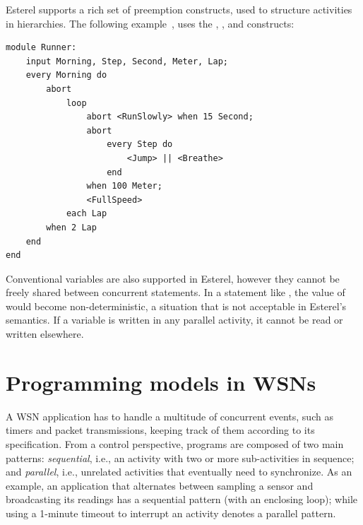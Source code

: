 Esterel supports a rich set of preemption constructs, used to structure 
activities in hierarchies.
The following example~\cite{esterel.foundations}, uses the , 
, and  constructs:

\begin{lstlisting}
module Runner:
    input Morning, Step, Second, Meter, Lap;
    every Morning do
        abort
            loop
                abort <RunSlowly> when 15 Second;
                abort
                    every Step do
                        <Jump> || <Breathe>
                    end
                when 100 Meter;
                <FullSpeed>
            each Lap
        when 2 Lap
    end
end
\end{lstlisting}


Conventional variables are also supported in Esterel, however they cannot be 
freely shared between concurrent statements.
In a statement like \code{[~v~:=~1~||~v~:=~2~]}, the value of  would 
become non-deterministic, a situation that is not acceptable in Esterel's 
semantics.
If a variable is written in any parallel activity, it cannot be read or written 
elsewhere.

\section{Programming models in WSNs}
\label{sec.ceu.overview}

A WSN application has to handle a multitude of concurrent events, such as 
timers and packet transmissions, keeping track of them according to its 
specification.
%
From a control perspective, programs are composed of two main patterns: 
\emph{sequential}, i.e., an activity with two or more sub-activities in 
sequence;
and \emph{parallel}, i.e., unrelated activities that eventually need to 
synchronize.
%
As an example, an application that alternates between sampling a sensor and 
broadcasting its readings has a sequential pattern (with an enclosing loop); 
while using a 1-minute timeout to interrupt an activity denotes a parallel 
pattern.


